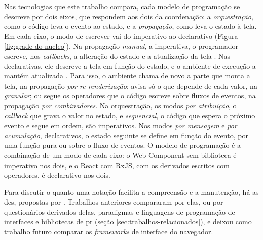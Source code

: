 Nas tecnologias que este trabalho compara, cada modelo de programação se
descreve por dois eixos, que respondem aos dois da coordenação: a
\emph{orquestração}, como o código leva o evento ao estado, e a \emph{propagação},
como leva o estado à tela.
Em cada eixo, o modo de escrever vai do imperativo ao declarativo
(Figura \ref{fig:grade-do-nucleo}).
Na propagação \emph{manual}, a imperativa, o programador escreve, nos
\emph{callbacks}, a alteração do estado e a atualização da tela
\cites[][ p. 93]{disch2025}[][ p. 229]{oney2012}.
Nas declarativas, ele descreve a tela em função do estado, e o ambiente
de execução a mantém atualizada \cite[p. 289:1 e 289:2]{lee2025}.
Para isso, o ambiente chama de novo a parte que monta a tela, na propagação
\emph{por re-renderização};
avisa só o que depende de cada valor, na \emph{granular}; ou segue os
operadores que o código escreve sobre fluxos de eventos, na propagação
\emph{por combinadores}.
Na orquestração, os modos \emph{por atribuição}, o \emph{callback} que grava o
valor no estado, e \emph{sequencial}, o código que espera o próximo evento e
segue em ordem, são imperativos.
Nos modos \emph{por mensagem} e \emph{por acumulação}, declarativos, o estado
seguinte se define em função do evento, por uma função pura ou sobre o
fluxo de eventos.
O modelo de programação é a combinação de um modo de cada eixo: o Web
Component sem biblioteca é imperativo nos dois, e o React com RxJS, com
os derivados escritos com operadores, é declarativo nos dois.

Para discutir o quanto uma notação facilita a compreensão e a
manutenção, há as \glspl{dc}, propostas por \textcite{green1989}.
Trabalhos anteriores compararam por elas, ou por questionários derivados
delas, paradigmas e linguagens de
programação de interfaces e bibliotecas de \gls{pr} (seção
\ref{sec:trabalhos-relacionados}), e \textcite[p. 104]{kiss2014}
deixou como trabalho futuro comparar os \emph{frameworks} de interface do
navegador.

